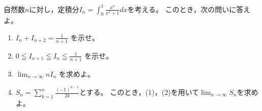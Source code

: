 \documentclass[11pt,a4paper]{jsarticle}
\begin{document}
\noindent
自然数$n$に対し，定積分$\displaystyle I_{n}=\int_{0}^{1} \frac{x^{n}}{x^{2}+1} d x$を考える。
このとき，次の問いに答えよ。
\begin{enumerate}[(1)]
 \item $\displaystyle I_{n}+I_{n+2}=\frac{1}{n+1}$ を示せ。
 \item $\displaystyle 0 \leqq I_{n+1} \leqq I_{n} \leqq \frac{1}{n+1}$ を示せ。
 \item $\displaystyle \lim _{n \rightarrow \infty} n I_{n}$ を求めよ。
 \item $\displaystyle S_{n}=\sum_{k=1}^{n} \frac{(-1)^{k-1}}{2 k}$とする。
 このとき，(1)，(2)を用いて$\displaystyle \lim _{n \rightarrow \infty} S_{n}$を求めよ。
\end{enumerate}
\end{document}
